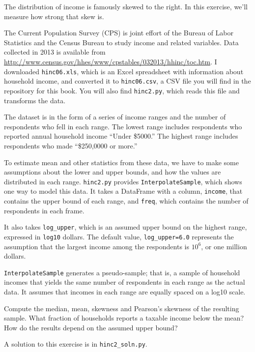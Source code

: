 \documentclass[12pt]{book}
\begin{document}
\begin{exercise}

The distribution of income is famously skewed to the right.  In this
exercise, we'll measure how strong that skew is.

The Current Population Survey (CPS) is joint effort of the Bureau
of Labor Statistics and the Census Bureau to study income and related
variables.  Data collected in 2013 is available from
\url{http://www.census.gov/hhes/www/cpstables/032013/hhinc/toc.htm}.
I downloaded {\tt hinc06.xls}, which is an Excel spreadsheet with
information about household income, and converted it to {\tt hinc06.csv},
a CSV file you will find in the repository for this book.  You
will also find {\tt hinc2.py}, which reads this file and transforms
the data.

The dataset is in the form of a series of income ranges and the number
of respondents who fell in each range.  The lowest range includes
respondents who reported annual household income ``Under \$5000.''
The highest range includes respondents who made ``\$250,0000 or
more.''

To estimate mean and other statistics from these data, we have to
make some assumptions about the lower and upper bounds, and how
the values are distributed in each range.  {\tt hinc2.py} provides
{\tt InterpolateSample}, which shows one way to model
this data.  It takes a DataFrame with a column, {\tt income}, that
contains the upper bound of each range, and {\tt freq}, which contains
the number of respondents in each frame.

It also takes \verb"log_upper", which is an assumed upper bound
on the highest range, expressed in {\tt log10} dollars.  
The default value, \verb"log_upper=6.0" represents the assumption
that the largest income among the respondents is
$10^6$, or one million dollars.

{\tt InterpolateSample} generates a pseudo-sample; that is, a sample
of household incomes that yields the same number of respondents
in each range as the actual data.  It assumes that incomes in
each range are equally spaced on a log10 scale.

Compute the median, mean, skewness and Pearson's skewness of the
resulting sample.  What fraction of households reports a taxable
income below the mean?  How do the results depend on the assumed
upper bound?

A solution to this exercise is in \verb"hinc2_soln.py".
\end{exercise}
\end{document}
